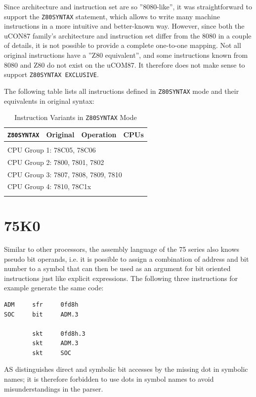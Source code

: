 \documentclass[12pt,twoside]{report}
\newcommand{\asname}{{AS}}
\begin{document}
Since architecture and instruction set are so ''8080-like'', it was
straightforward to support the {\tt Z80SYNTAX} statement, which
allows to write many machine instructions in a more intuitive and
better-known way.  However, since both the uCON87 family's architecture
and instruction set differ from the 8080 in a couple of details, it
is not possible to provide a complete one-to-one mapping.  Not all
original instructions have a ''Z80 equivalent'', and some instructions
known from 8080 and Z80 do not exist on the uCOM87.  It therefore
does not make sense to support {\tt Z80SYNTAX EXCLUSIVE}.

The following table lists all instructions defined in {\tt Z80SYNTAX}
mode and their equivalents in original syntax:

\begin{longtable}{|l|l|l|l|}
\hline
{\tt Z80SYNTAX} & Original & Operation  & CPUs \\
\hline
\hline
\endhead

\\ \hline
\multicolumn{4}{|l|}{CPU Group 1: 78C05, 78C06} \\
\multicolumn{4}{|l|}{CPU Group 2: 7800, 7801, 7802} \\
\multicolumn{4}{|l|}{CPU Group 3: 7807, 7808, 7809, 7810} \\
\multicolumn{4}{|l|}{CPU Group 4: 7810, 78C1x} \\
\hline
\caption{Instruction Variants in {\tt Z80SYNTAX} Mode}
\end{longtable}


\section{75K0}
\label{75K0Spec}

Similar to other processors, the assembly language of the 75 series
also knows pseudo bit operands, i.e. it is possible to assign a
combination of address and bit number to a symbol that can then be
used as an argument for bit oriented instructions just like explicit
expressions.  The following three instructions for example generate
the same code:
\begin{verbatim}
ADM     sfr     0fd8h
SOC     bit     ADM.3

        skt     0fd8h.3
        skt     ADM.3
        skt     SOC
\end{verbatim}
\asname{} distinguishes direct and symbolic bit accesses by the missing dot
in symbolic names; it is therefore forbidden to use dots in symbol
names to avoid misunderstandings in the parser.
\end{document}
